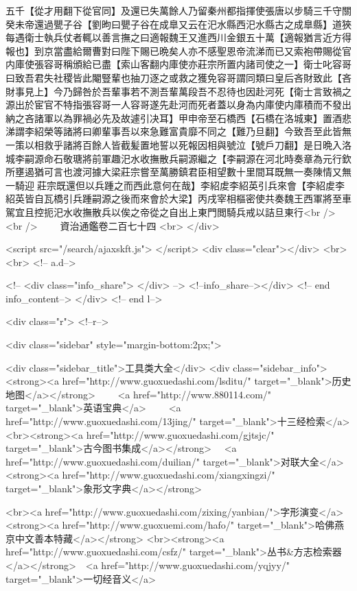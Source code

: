 五千【從才用翻下從官同】及還已失萬餘人乃留秦州都指揮使張唐以步騎三千守關癸未帝還過甖子谷【劉昫曰甖子谷在成臯又云在汜水縣西汜水縣古之成臯縣】道狹每遇衛士執兵仗者輒以善言撫之曰適報魏王又進西川金銀五十萬【適報猶言近方得報也】到京當盡給爾曹對曰陛下賜已晩矣人亦不感聖恩帝流涕而已又索袍帶賜從官内庫使張容哥稱頒給已盡【索山客翻内庫使亦莊宗所置内諸司使之一】衛士叱容哥曰致吾君失社稷皆此閹豎輩也抽刀逐之或救之獲免容哥謂同類曰皇后吝財致此【吝財事見上】今乃歸咎於吾輩事若不測吾輩萬段吾不忍待也因赴河死【衛士言致禍之源出於宦官不特指張容哥一人容哥遂先赴河而死者蓋以身為内庫使内庫積而不發出納之吝諸軍以為罪禍必先及故遽引决耳】甲申帝至石橋西【石橋在洛城東】置酒悲涕謂李紹榮等諸將曰卿輩事吾以來急難富貴靡不同之【難乃旦翻】今致吾至此皆無一策以相救乎諸將百餘人皆截髪置地誓以死報因相與號泣【號戶刀翻】是日晩入洛城李嗣源命石敬瑭將前軍趣汜水收撫散兵嗣源繼之【李嗣源在河北時奏章為元行欽所壅遏猶可言也渡河據大梁莊宗嘗至萬勝鎮君臣相望數十里間耳既無一奏陳情又無一騎迎莊宗既還但以兵踵之而西此意何在哉】李紹䖍李紹英引兵來會【李紹䖍李紹英皆自瓦橋引兵踵嗣源之後而來會於大梁】丙戌宰相樞密使共奏魏王西軍將至車駕宜且控扼汜水收撫散兵以俟之帝從之自出上東門閲騎兵戒以詰旦東行<br />
<br />
　　資治通鑑卷二百七十四  <br>
   </div> 

<script src="/search/ajaxskft.js"> </script>
 <div class="clear"></div>
<br>
<br>
 <!-- a.d-->

 <!--
<div class="info_share">
</div> 
-->
 <!--info_share--></div>   <!-- end info_content-->
  </div> <!-- end l-->

<div class="r">   <!--r-->



<div class="sidebar"  style="margin-bottom:2px;">

 
<div class="sidebar_title">工具类大全</div>
<div class="sidebar_info">
<strong><a href="http://www.guoxuedashi.com/lsditu/" target="_blank">历史地图</a></strong>　　
<a href="http://www.880114.com/" target="_blank">英语宝典</a>　　
<a href="http://www.guoxuedashi.com/13jing/" target="_blank">十三经检索</a>　
<br><strong><a href="http://www.guoxuedashi.com/gjtsjc/" target="_blank">古今图书集成</a></strong>　
<a href="http://www.guoxuedashi.com/duilian/" target="_blank">对联大全</a>　<strong><a href="http://www.guoxuedashi.com/xiangxingzi/" target="_blank">象形文字典</a></strong>　

<br><a href="http://www.guoxuedashi.com/zixing/yanbian/">字形演变</a>　　<strong><a href="http://www.guoxuemi.com/hafo/" target="_blank">哈佛燕京中文善本特藏</a></strong>
<br><strong><a href="http://www.guoxuedashi.com/csfz/" target="_blank">丛书&方志检索器</a></strong>　<a href="http://www.guoxuedashi.com/yqjyy/" target="_blank">一切经音义</a>　　

